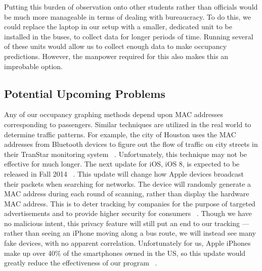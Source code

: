 Putting this burden of observation onto other students rather than officials would be much more manageable in terms of dealing with bureaucracy.
To do this, we could replace the laptop in our setup with a smaller, dedicated unit to be installed in the buses, to collect data for longer periods of time.
Running several of these units would allow us to collect enough data to make occupancy predictions.
However, the manpower required for this also makes this an improbable option.

\subsection{Potential Upcoming Problems}
Any of our occupancy graphing methods depend upon MAC addresses corresponding to passengers.
Similar techniques are utilized in the real world to determine traffic patterns. 
For example, the city of Houston uses the MAC addresses from Bluetooth devices to figure out the flow of traffic on city streets in their TranStar monitoring system ~\cite{ios8_privacy}.
Unfortunately, this technique may not be effective for much longer.
The next update for iOS, iOS 8, is expected to be released in Fall 2014 ~\cite{ios8_overview}.
This update will change how Apple devices broadcast their packets when searching for networks.
The device will randomly generate a MAC address during each round of scanning, rather than display the hardware MAC address.
This is to deter tracking by companies for the purpose of targeted advertisements and to provide higher security for consumers ~\cite{ios8_privacy}.
Though we have no malicious intent, this privacy feature will still put an end to our tracking --- rather than seeing an iPhone moving along a bus route, we will instead see many fake devices, with no apparent correlation.
Unfortunately for us, Apple iPhones make up over 40\% of the smartphones owned in the US, so this update would greatly reduce the effectiveness of our program ~\cite{iphone_ownership}.

